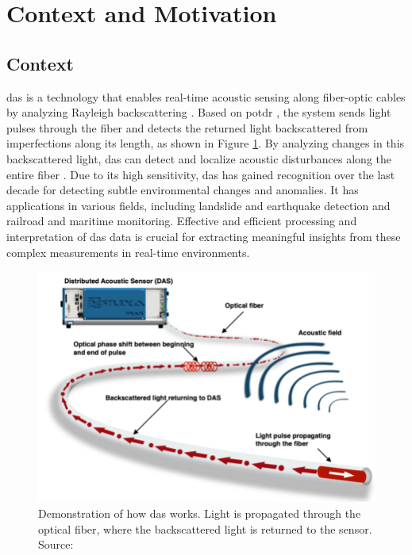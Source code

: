 \section{Context and Motivation}


\subsection{Context} 

\acrshort{das} is a technology that enables real-time acoustic sensing along fiber-optic cables by analyzing Rayleigh backscattering \cite{s22166060}. Based on \acrfull{potdr} \cite{s16050681}, the system sends light pulses through the fiber and detects the returned light backscattered from imperfections along its length, as shown in Figure \ref{fig:das-fig}. By analyzing changes in this backscattered light, \acrshort{das} can detect and localize acoustic disturbances along the entire fiber \cite{shang2016optical}. Due to its high sensitivity, \acrshort{das} has gained recognition over the last decade for detecting subtle environmental changes and anomalies. It has applications in various fields, including landslide and earthquake detection and railroad and maritime monitoring. Effective and efficient processing and interpretation of \acrshort{das} data is crucial for extracting meaningful insights from these complex measurements in real-time environments.

\begin{figure}[!h]
    \centering
    \includegraphics[width=0.7\linewidth]{figures/das.png}
    \caption{Demonstration of how \acrshort{das} works. Light is propagated through the optical fiber, where the backscattered light is returned to the sensor. Source: \cite{dasimg}}
    \label{fig:das-fig}
\end{figure}

